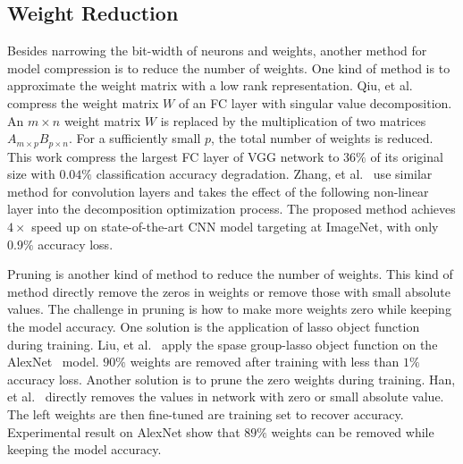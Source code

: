 \subsection{Weight Reduction}
Besides narrowing the bit-width of neurons and weights, another method for model compression is to reduce the number of weights. One kind of method is to approximate the weight matrix with a low rank representation. Qiu, et al.~\cite{qiu2016going} compress the weight matrix $W$ of an FC layer with singular value decomposition. An $m\times n$ weight matrix $W$ is replaced by the multiplication of two matrices $A_{m\times p}B_{p\times n}$. For a sufficiently small $p$, the total number of weights is reduced. This work compress the largest FC layer of VGG network to $36\%$ of its original size with $0.04\%$ classification accuracy degradation. Zhang, et al.~\cite{zhang2015efficient} use similar method for convolution layers and takes the effect of the following non-linear layer into the decomposition optimization process. The proposed method achieves $4\times$ speed up on state-of-the-art CNN model targeting at ImageNet, with only $0.9\%$ accuracy loss.

Pruning is another kind of method to reduce the number of weights. This kind of method directly remove the zeros in weights or remove those with small absolute values. The challenge in pruning is how to make more weights zero while keeping the model accuracy. One solution is the application of lasso object function during training. Liu, et al.~\cite{liu2015sparse} apply the spase group-lasso object function on the AlexNet~\cite{krizhevsky2012imagenet} model. $90\%$ weights are removed after training with less than $1\%$ accuracy loss. Another solution is to prune the zero weights during training. Han, et al.~\cite{han2015deep} directly removes the values in network with zero or small absolute value. The left weights are then fine-tuned are training set to recover accuracy. Experimental result on AlexNet show that $89\%$ weights can be removed while keeping the model accuracy.